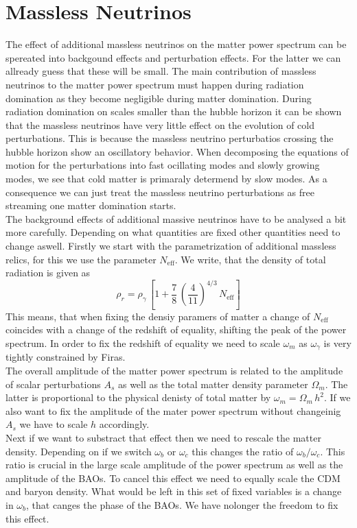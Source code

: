 \documentclass[oneside]{book}
\begin{document}
\section{Massless Neutrinos}
The effect of additional massless neutrinos on the matter power spectrum can be spereated into backgound effects and perturbation effects. For the latter we can allready guess that these will be small. The main contribution of massless neutrinos to the matter power spectrum must happen during radiation domination as they become negligible during matter domination. During radiation domination on scales smaller than the hubble horizon it can be shown that the massless neutrinos have very little effect on the evolution of cold perturbations. This is because the massless neutrino perturbatios crossing the hubble horizon show an oscillatory behavior. When decomposing the equations of motion for the perturbations into fast ocillating modes and slowly growing modes, we see that cold matter is primaraly determend by slow modes. As a consequence we can just treat the massless neutrino perturbations as free streaming one matter domination starts.\\
The background effects of additional massive neutrinos have to be analysed a bit more carefully. Depending on what quantities are fixed other quantities need to change aswell. Firstly we start with the parametrization of additional massless relics, for this we use the parameter $N_\mathrm{eff}$. We write, that the density of total radiation is given as 
\begin{equation}
    \rho_r = \rho_\gamma\,\left[1+\frac{7}{8}\,\left(\frac{4}{11}\right)^{4/3}\,N_\mathrm{eff} \right]
\end{equation}
This means, that when fixing the densiy paramers of matter a change of $N_\mathrm{eff}$ coincides with a change of the redshift of equality, shifting the peak of the power spectrum. In order to fix the redshift of equality we need to scale $\omega_m$ as $\omega_\gamma$ is very tightly constrained by Firas.\\
The overall amplitude of the matter power spectrum is related to the amplitude of scalar perturbations $A_s$ as well as the total matter density parameter $\Omega_m$. The latter is proportional to the physical denisty of total matter by $\omega_m=\Omega_m\,h^2$. If we also want to fix the amplitude of the mater power spectrum without changeinig $A_s$ we have to scale $h$ accordingly.\\
Next if we want to substract that effect then we need to rescale the matter density. Depending on if we switch $\omega_b$ or $\omega_c$ this changes the ratio of $\omega_b/\omega_c$. This ratio is crucial in the large scale amplitude of the power spectrum as well as the amplitude of the BAOs. To cancel this effect we need to equally scale the CDM and baryon density. What would be left in this set of fixed variables is a change in $\omega_b$, that canges the phase of the BAOs. We have nolonger the freedom to fix this effect.\\
\end{document}
